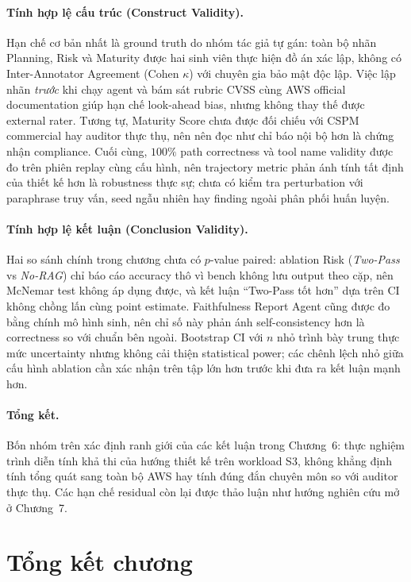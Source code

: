 \paragraph*{Tính hợp lệ cấu trúc (Construct Validity).}
Hạn chế cơ bản nhất là ground truth do nhóm tác giả tự gán: toàn bộ nhãn Planning, Risk và Maturity được hai sinh viên thực hiện đồ án xác lập, không có Inter-Annotator Agreement (Cohen $\kappa$) với chuyên gia bảo mật độc lập. Việc lập nhãn \textit{trước} khi chạy agent và bám sát rubric CVSS cùng AWS official documentation giúp hạn chế look-ahead bias, nhưng không thay thế được external rater. Tương tự, Maturity Score chưa được đối chiếu với CSPM commercial hay auditor thực thụ, nên nên đọc như chỉ báo nội bộ hơn là chứng nhận compliance. Cuối cùng, $100\%$ path correctness và tool name validity được đo trên phiên replay cùng cấu hình, nên trajectory metric phản ánh tính tất định của thiết kế hơn là robustness thực sự; chưa có kiểm tra perturbation với paraphrase truy vấn, seed ngẫu nhiên hay finding ngoài phân phối huấn luyện.

\paragraph*{Tính hợp lệ kết luận (Conclusion Validity).}
Hai so sánh chính trong chương chưa có $p$-value paired: ablation Risk (\textit{Two-Pass} vs \textit{No-RAG}) chỉ báo cáo accuracy thô vì bench không lưu output theo cặp, nên McNemar test không áp dụng được, và kết luận ``Two-Pass tốt hơn'' dựa trên CI không chồng lấn cùng point estimate. Faithfulness Report Agent cũng được đo bằng chính mô hình sinh, nên chỉ số này phản ánh self-consistency hơn là correctness so với chuẩn bên ngoài. Bootstrap CI với $n$ nhỏ trình bày trung thực mức uncertainty nhưng không cải thiện statistical power; các chênh lệch nhỏ giữa cấu hình ablation cần xác nhận trên tập lớn hơn trước khi đưa ra kết luận mạnh hơn.

\paragraph*{Tổng kết.}
Bốn nhóm trên xác định ranh giới của các kết luận trong Chương~6: thực nghiệm trình diễn tính khả thi của hướng thiết kế trên workload S3, không khẳng định tính tổng quát sang toàn bộ AWS hay tính đúng đắn chuyên môn so với auditor thực thụ. Các hạn chế residual còn lại được thảo luận như hướng nghiên cứu mở ở Chương~7.


\section{Tổng kết chương}
\label{sec:ch6_summary}

